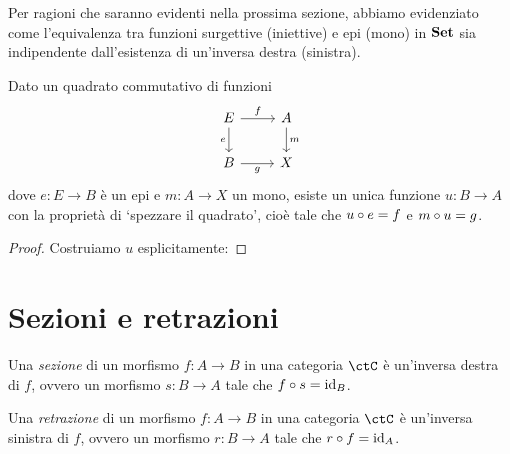 Per ragioni che saranno evidenti nella prossima sezione,
abbiamo evidenziato come l'equivalenza tra funzioni surgettive (iniettive)
e epi (mono) in \(\mathbf{Set}\) sia indipendente dall'esistenza di un'inversa destra (sinistra).


\begin{proposition}
    Dato un quadrato commutativo di funzioni
    \[\begin{tikzcd}
        E \ar[r,"f"]\ar[d, "e"']& A\ar[d, "m"] \\
        B \ar[r, "g"'] & X
    \end{tikzcd}\]
    dove $e : E\to B$ è un epi e $m : A \to X$ un mono, esiste un unica funzione $u : B\to A$ con la proprietà di `spezzare il quadrato', cioè tale che $u\circ e=f$ e $m\circ u=g$.
\end{proposition}
\begin{proof}
    Costruiamo $u$ esplicitamente: \Todo{}
\end{proof}
\section{Sezioni e retrazioni}

\begin{definition}[Sezione]
	Una \emph{sezione} di un morfismo \(f \colon A \to B\) in una categoria \(\ctC\) è un'inversa destra di \(f\), ovvero un morfismo \(s \colon B \to A\) tale che \(f \circ s = \mathrm{id}_{B}\).
\end{definition}

\begin{definition}[Retrazione]
	Una \emph{retrazione} di un morfismo \(f \colon A \to B\) in una categoria \(\ctC\) è un'inversa sinistra di \(f\), ovvero un morfismo \(r \colon B \to A\) tale che \(r \circ f = \mathrm{id}_{A}\).
\end{definition}
